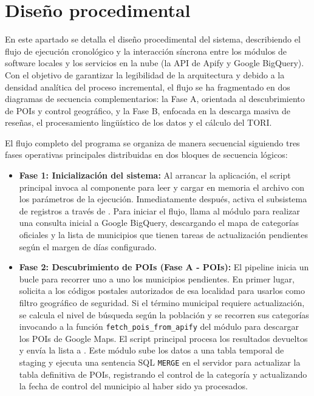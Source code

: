 

\section{Diseño procedimental}
En este apartado se detalla el diseño procedimental del sistema, describiendo el flujo de ejecución cronológico y la interacción síncrona entre los módulos de software locales y los servicios en la nube (la API de Apify y Google BigQuery). Con el objetivo de garantizar la legibilidad de la arquitectura y debido a la densidad analítica del proceso incremental, el flujo se ha fragmentado en dos diagramas de secuencia complementarios: la Fase A, orientada al descubrimiento de POIs y control geográfico, y la Fase B, enfocada en la descarga masiva de reseñas, el procesamiento lingüístico de los datos y el cálculo del TORI.

El flujo completo del programa se organiza de manera secuencial siguiendo tres fases operativas principales distribuidas en dos bloques de secuencia lógicos:

\begin{itemize}
	\item \textbf{Fase 1: Inicialización del sistema:} Al arrancar la aplicación, el script principal  invoca al componente  para leer y cargar en memoria el archivo  con los parámetros de la ejecución. Inmediatamente después, activa el subsistema de registros a través de . Para iniciar el flujo, llama al módulo  para realizar una consulta inicial a Google BigQuery, descargando el mapa de categorías oficiales y la lista de municipios que tienen tareas de actualización pendientes según el margen de días configurado.
	\item \textbf{Fase 2: Descubrimiento de POIs (Fase A - POIs):} El pipeline inicia un bucle para recorrer uno a uno los municipios pendientes. En primer lugar, solicita a  los códigos postales autorizados de esa localidad para usarlos como filtro geográfico de seguridad. Si el término municipal requiere actualización, se calcula el nivel de búsqueda según la población y se recorren sus categorías invocando a la función \texttt{fetch\_pois\_from\_apify} del módulo  para descargar los POIs de Google Maps. El script principal procesa los resultados devueltos y envía la lista a . Este módulo sube los datos a una tabla temporal de staging y ejecuta una sentencia SQL \texttt{MERGE} en el servidor para actualizar la tabla definitiva de POIs, registrando el control de la categoría y actualizando la fecha de control del municipio al haber sido ya procesados.
\end{itemize}

